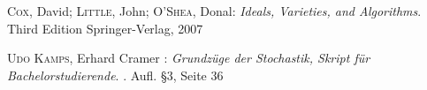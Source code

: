 \documentclass{article}
\begin{document}
\begin{thebibliography}{99}
	\textsc{Cox}, David; \textsc{Little}, John; \textsc{O'Shea}, Donal:
	\newblock \emph{Ideals, Varieties, and Algorithms}.
	\newblock Third Edition
	\newblock Springer-Verlag, 2007
	
	\textsc{Udo Kamps}, Erhard Cramer :
	\newblock \emph{Grundzüge der Stochastik, Skript für Bachelorstudierende}.
	. Aufl.
	\newblock §3, Seite 36
	
\end{thebibliography}
\end{document}
